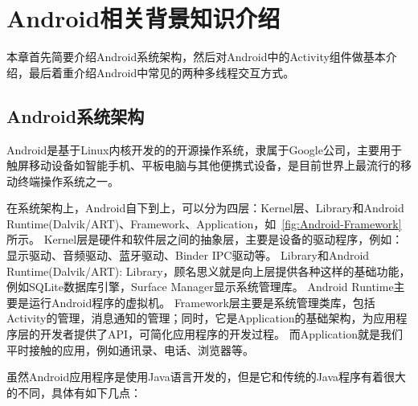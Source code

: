 \chapter{Android相关背景知识介绍 }  
\label{chp:background}


本章首先简要介绍Android系统架构，然后对Android中的Activity组件做基本介绍，最后着重介绍Android中常见的两种多线程交互方式。


\section{Android系统架构}

Android是基于Linux内核开发的的开源操作系统，隶属于Google公司，主要用于触屏移动设备如智能手机、平板电脑与其他便携式设备，是目前世界上最流行的移动终端操作系统之一。


在系统架构上，Android自下到上，可以分为四层：Kernel层、Library和Android Runtime(Dalvik/ART)、Framework、Application，如~\autoref{fig:Android-Framework}所示。
Kernel层是硬件和软件层之间的抽象层，主要是设备的驱动程序，例如：显示驱动、音频驱动、蓝牙驱动、Binder IPC驱动等。
Library和Android Runtime(Dalvik/ART): Library，顾名思义就是向上层提供各种这样的基础功能，例如SQLite数据库引擎，Surface Manager显示系统管理库。
Android Runtime主要是运行Android程序的虚拟机。
Framework层主要是系统管理类库，包括Activity的管理，消息通知的管理；同时，它是Application的基础架构，为应用程序层的开发者提供了API，可简化应用程序的开发过程。
而Application就是我们平时接触的应用，例如通讯录、电话、浏览器等。

虽然Android应用程序是使用Java语言开发的，但是它和传统的Java程序有着很大的不同，具体有如下几点：

